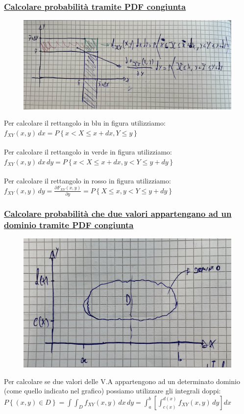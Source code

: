 \documentclass{article}
\begin{document}
\subsubsection{\underline{Calcolare probabilità tramite PDF congiunta}}
\begin{figure}[ht]
\centering
\includegraphics[scale=0.14]{images/78.CalcoloProbPDFCong.jpeg}
\end{figure} 
Per calcolare il rettangolo in blu in figura utilizziamo: \\
$f_{XY}(x,y)\,dx = P \left\{x < X \leq x + dx,Y \leq y\right\}$ \\ \\
Per calcolare il rettangolo in verde in figura utilizziamo: \\
$f_{XY}(x,y)\,dx\,dy = P \left\{x < X \leq x + dx, y < Y \leq y +dy\right\}$ \\ \\
Per calcolare il rettangolo in rosso in figura utilizziamo: \\
$f_{XY}(x,y)\,dy = \frac{\partial F_{XY}(x,y)}{\partial y} = P \left\{X \leq x ,y < Y \leq y + dy \right\}$
\subsubsection{\underline{Calcolare probabilità che due valori appartengano ad un dominio tramite PDF congiunta}}
\begin{figure}[ht]
\centering
\includegraphics[scale=0.14]{images/79.Prob_VA_inDom.jpeg}
\end{figure} 
Per calcolare se due valori delle V.A appartengono ad un determinato dominio (come quello indicato nel grafico) possiamo utilizzare gli integrali doppi: \\
$P \left\{(x,y) \in D \right\} = \int \int_D f_{XY}(x,y) \,dx\,dy = \int_{a}^{b} \left[ \int_{c(x)}^{d(x)} f_{XY}(x,y) \,dy \right] dx$
\end{document}
